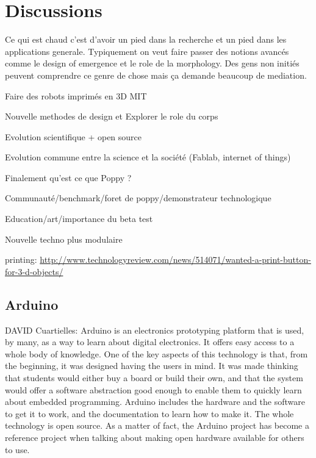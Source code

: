 
\chapter{Discussions} %
\label{cha:discussion}

Ce qui est chaud c'est d'avoir un pied dans la recherche et un pied dans les applications generale. Typiquement on veut faire passer des notions avancés comme le design of emergence et le role de la morphology. Des gens non initiés peuvent comprendre ce genre de chose mais ça demande beaucoup de mediation.


Faire des robots imprimés en 3D MIT

Nouvelle methodes de design et Explorer le role du corps


Evolution scientifique + open source

Evolution commune entre la science et la société (Fablab, internet of things)

Finalement qu'est ce que Poppy ?

Communauté/benchmark/foret de poppy/demonstrateur technologique

Education/art/importance du beta test

Nouvelle techno plus modulaire





printing:
\url{http://www.technologyreview.com/news/514071/wanted-a-print-button-for-3-d-objects/}



\section{Arduino} %
\label{sec:arduino}


DAVID Cuartielles: Arduino is an electronics prototyping platform that is used, by many, as a way to learn about digital electronics. It offers easy access to a whole body of knowledge. One of the key aspects of this technology is that, from the beginning, it was designed having the users in mind. It was made thinking that students would either buy a board or build their own, and that the system would offer a software abstraction good enough to enable them to quickly learn about embedded programming. Arduino includes the hardware and the software to get it to work, and the documentation to learn how to make it. The whole technology is open source. As a matter of fact, the Arduino project has become a reference project when talking about making open hardware available for others to use.

